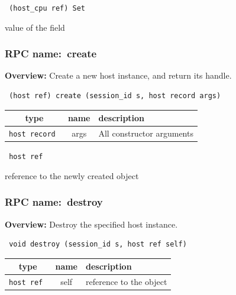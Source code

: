 \vspace{0.3cm}

{\tt 
(host\_cpu ref) Set
}


value of the field
\vspace{0.3cm}
\vspace{0.3cm}
\vspace{0.3cm}
\subsubsection{RPC name:~create}

{\bf Overview:} 
Create a new host instance, and return its handle.

\begin{verbatim} (host ref) create (session_id s, host record args)\end{verbatim}



 
\vspace{0.3cm}
\begin{tabular}{|c|c|p{7cm}|}
 \hline
{\bf type} & {\bf name} & {\bf description} \\ \hline
{\tt host record } & args & All constructor arguments \\ \hline 

\end{tabular}

\vspace{0.3cm}

{\tt 
host ref
}


reference to the newly created object
\vspace{0.3cm}
\vspace{0.3cm}
\vspace{0.3cm}
\subsubsection{RPC name:~destroy}

{\bf Overview:} 
Destroy the specified host instance.

\begin{verbatim} void destroy (session_id s, host ref self)\end{verbatim}



 
\vspace{0.3cm}
\begin{tabular}{|c|c|p{7cm}|}
 \hline
{\bf type} & {\bf name} & {\bf description} \\ \hline
{\tt host ref } & self & reference to the object \\ \hline 

\end{tabular}

